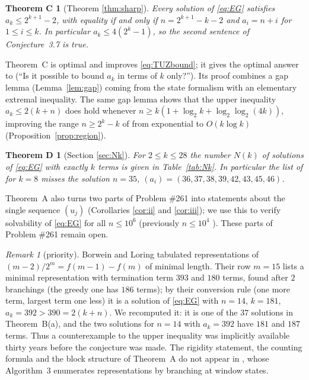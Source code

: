 \documentclass[11pt]{amsart}
\newtheorem*{theoremC}{Theorem C}
\newtheorem*{theoremD}{Theorem D}
\theoremstyle{definition}
\theoremstyle{remark}
\newtheorem{remark}[theorem]{Remark}
\begin{document}
\begin{theoremC}[Theorem \ref{thm:sharp}]
Every solution of \eqref{eq:EG} satisfies $a_k\le 2^{k+1}-2$, with equality if and only if $n=2^{k+1}-k-2$ and $a_i=n+i$ for $1\le i\le k$. In particular $a_k\le 4(2^k-1)$, so the second sentence of Conjecture~3.7 is true.
\end{theoremC}

Theorem~C is optimal and improves \eqref{eq:TUZbound}; it gives the optimal answer to \cite[Question~1.2]{TUZ} (``Is it possible to bound $a_k$ in terms of $k$ only?''). Its proof combines a gap lemma (Lemma~\ref{lem:gap}) coming from the state formalism with an elementary extremal inequality. The same gap lemma shows that the upper inequality $a_k\le2(k+n)$ does hold whenever $n\ge k(1+\log_2k+\log_2\log_2(4k))$, improving the range $n\ge2^k-k$ of \cite[Rem.~3.8]{TUZ} from exponential to $O(k\log k)$ (Proposition~\ref{prop:region}).

\begin{theoremD}[Section \ref{sec:Nk}]
For $2\le k\le 28$ the number $N(k)$ of solutions of \eqref{eq:EG} with exactly $k$ terms is given in Table~\ref{tab:Nk}. In particular the list of \cite[Thm.~2.5]{TUZ} for $k=8$ misses the solution $n=35$, $(a_i)=(36,37,38,39,42,43,45,46)$.
\end{theoremD}

Theorem~A also turns two parts of Problem \#261 into statements about the single sequence $(u_j)$ (Corollaries \ref{cor:ii} and \ref{cor:iii}); we use this to verify solvability of \eqref{eq:EG} for all $n\le 10^6$ (previously $n\le10^4$ \cite{TUZ}). These parts of Problem \#261 remain open.

\begin{remark}[priority]\label{rem:BL}
Borwein and Loring \cite[\S5]{BL90} tabulated representations of $(m-2)/2^m=f(m-1)-f(m)$ of minimal length. Their row $m=15$ lists a minimal representation with termination term $393$ and $180$ terms, found after $2$ branchings (the greedy one has $186$ terms); by their conversion rule (one more term, largest term one less) it is a solution of \eqref{eq:EG} with $n=14$, $k=181$, $a_k=392>390=2(k+n)$. We recomputed it: it is one of the $37$ solutions in Theorem~B(a), and the two solutions for $n=14$ with $a_k=392$ have $181$ and $187$ terms. Thus a counterexample to the upper inequality was implicitly available thirty years before the conjecture was made. The rigidity statement, the counting formula and the block structure of Theorem~A do not appear in \cite{BL90}, whose Algorithm~3 enumerates representations by branching at window states.
\end{remark}
\end{document}
